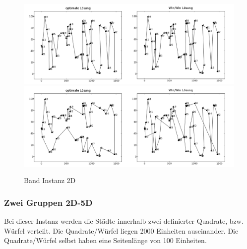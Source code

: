 \documentclass[11pt,a4paper]{article}
\begin{document}
\begin{figure}[H]
    \centering
    \includegraphics[width=15cm]{gfx/belt_hpp_comparison}
    \includegraphics[width=15cm]{gfx/belt_tsp_comparison}
    \caption{Band Instanz 2D}
    \label{img:belt_comparison}
\end{figure}

\subsubsection{Zwei Gruppen 2D-5D}
Bei dieser Instanz werden die Städte innerhalb zwei definierter Quadrate, bzw. Würfel verteilt. Die Quadrate/Würfel liegen 2000 Einheiten auseinander. Die Quadrate/Würfel selbst haben eine Seitenlänge von 100 Einheiten.
\end{document}

